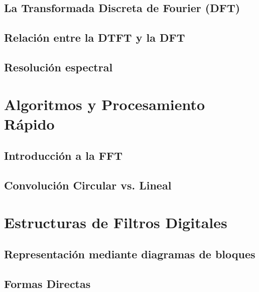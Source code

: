 \documentclass[11pt,a4paper,openany]{book}
\begin{document}
\section{La Transformada Discreta de Fourier (DFT)}

\section{Relación entre la DTFT y la DFT}

\section{Resolución espectral}

\chapter{Algoritmos y Procesamiento Rápido}

\section{Introducción a la FFT}

\section{Convolución Circular vs. Lineal}



\chapter{Estructuras de Filtros Digitales}

\section{Representación mediante diagramas de bloques}

\section{Formas Directas}
\end{document}

